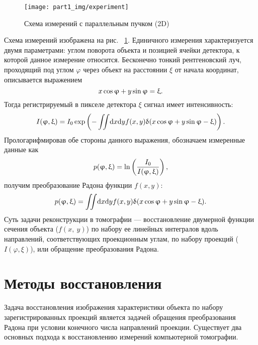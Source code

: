 \begin{figure}[h!]
  \centering
  \texttt{[image: part1\_img/experiment]}
  \caption{Схема измерений с параллельным пучком (2D)}
  \label{fig:experiment}
\end{figure}

Схема измерений изображена на рис. ~\ref{fig:experiment}.
Единичного измерения характеризуется двумя параметрами: углом поворота объекта и позицией ячейки детектора, к которой данное измерение относится.
Бесконечно тонкий рентгеновский луч, проходящий под углом $\varphi$  через объект на расстоянии $\xi$  от начала координат, описывается выражением
\begin{equation}\notag
  x\cos\varphi + y\sin\varphi = \xi.
\end{equation}
Тогда регистрируемый в пикселе детектора $\xi$ сигнал имеет интенсивность:
\begin{equation}\notag
  I(\varphi, \xi) = I_0 \exp\left( {-\iint \! \mathrm d x \mathrm d y f(x,y)\delta(x\cos\varphi + y\sin\varphi - \xi)}\right).
\end{equation}
Прологарифмировав обе стороны данного выражения, обозначаем измеренные данные как
\begin{equation}\notag
  p(\varphi, \xi) = \ln \left (\frac{I_0}{I(\varphi, \xi)} \right),
\end{equation}
получим преобразование Радона функции $f(x,y)$:
\begin{equation}\notag
  p(\varphi, \xi)= \iint \! \mathrm d x \mathrm d y f(x,y)\delta(x\cos\varphi + y\sin\varphi - \xi).
\end{equation}
Суть задачи реконструкции в томографии --- восстановление двумерной функции сечения объекта ($f(x,\ y)$) по набору ее линейных интегралов вдоль направлений, соответствующих проекционным углам, по набору проекций ($I(\varphi, \xi)$), или обращение преобразования Радона.

\section{Методы восстановления}
Задача восстановления изображения характеристики объекта по набору зарегистрированных проекций является задачей обращения преобразования Радона при условии конечного числа направлений проекции.
Существует два основных подхода к восстановлению измерений компьютерной томографии.

